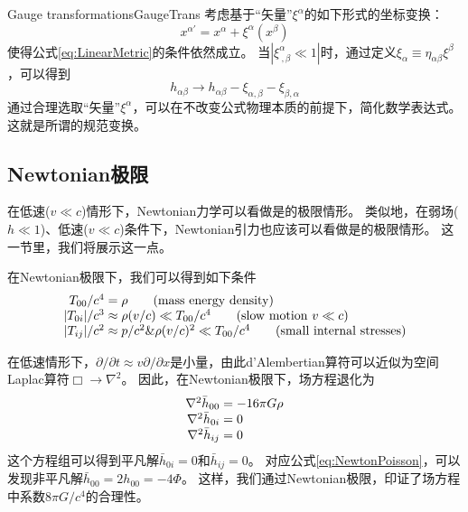 \begin{myprop}{Gauge transformations}{GaugeTrans}
  考虑基于“矢量”$\xi^\alpha$的如下形式的坐标变换：
\begin{equation}\label{eq:ChangeCoord}
  x^{\alpha\prime} = x^{\alpha} + \xi^\alpha(x^\beta)
\end{equation}
  使得公式\ref{eq:LinearMetric}的条件依然成立。
  当$|\xi^\alpha_{~,\beta} \ll 1|$时，通过定义$\xi_\alpha \equiv \eta_{\alpha\beta}\xi^\beta$，可以得到 
\begin{equation}\label{eq:habChange}
  h_{\alpha\beta} \to h_{\alpha\beta} - \xi_{\alpha,\beta}- \xi_{\beta,\alpha}
\end{equation}
通过合理选取“矢量”$\xi^\alpha$，可以在不改变公式物理本质的前提下，简化数学表达式。
这就是所谓的规范变换。
\end{myprop}


\subsection{Newtonian极限}\label{sec:Newtonian}
在低速($v \ll c$)情形下，Newtonian力学可以看做是\SR 的极限情形。
类似地，在弱场($h \ll 1$)、低速($v \ll c$)条件下，Newtonian引力也应该可以看做是\GR 的极限情形。
这一节里，我们将展示这一点。

在Newtonian极限下，我们可以得到如下条件
\begin{equation}\label{eq:TmunuNewton}
\begin{array}{r@{}l}
  T_{00}/c^4      &{} = \rho \qquad ({\rm mass~energy~density}) \\
  | T_{0i}| /c^3  &{} \approx \rho (v/c) \ll T_{00}/c^4 \qquad ({\rm slow~motion}~v \ll c) \\
  | T_{ij}| /c^2  &{} \approx p/c^2 \& \rho(v/c)^2 \ll T_{00}/c^4 \qquad ({\rm small~internal~stresses})
\end{array}
\end{equation}

在低速情形下，$\partial /\partial t \approx v \partial /\partial x $是小量，由此d’Alembertian算符可以近似为空间Laplac算符$\Box \to \nabla^2$。
因此，在Newtonian极限下，场方程退化为
\begin{equation}\label{eq:EinsteinEqNewton}
\begin{array}{r@{}l}
  \nabla^2 \bar{h}_{00} &{}= -16\pi G \rho\\
  \nabla^2 \bar{h}_{0i} &{}= 0 \\
  \nabla^2 \bar{h}_{ij} &{}= 0 \\
\end{array}
\end{equation}
这个方程组可以得到平凡解$\bar{h}_{0i} = 0$和$\bar{h}_{ij}= 0 $。
对应公式\ref{eq:NewtonPoisson}，可以发现非平凡解$\bar{h}_{00}=2h_{00}=-4\Phi$。
这样，我们通过Newtonian极限，印证了场方程中系数$8\pi G/c^4$的合理性。

